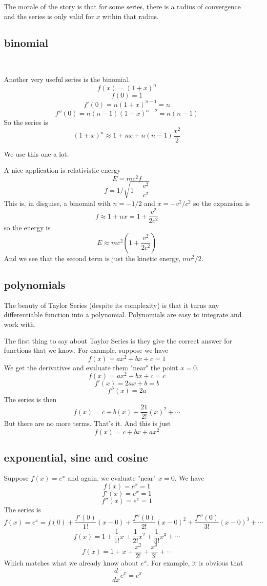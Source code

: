\documentclass[11pt, oneside]{article}
\begin{document}
The morale of the story is that for some series, there is a radius of convergence and the series is only valid for $x$ within that radius.

\subsection*{binomial}\

Another very useful series is the binomial.
\[ f(x) = (1 + x)^n \]
\[ f(0) = 1 \]
\[ f'(0) = n(1 + x)^{n-1} = n \]
\[ f''(0) = n(n-1)(1 + x)^{n-2} = n(n-1) \]
So the series is
\[ (1 + x)^n \approx 1 + nx + n(n-1) \frac{x^2}{2} \]

We use this one a lot.

A nice application is relativistic energy
\[ E = mc^2 f \]
\[ f =  1/\sqrt{1-\frac{v^2}{c^2}} \]
This is, in disguise, a binomial with $n=-1/2$ and $x=-v^2/c^2$ so the expansion is
\[ f  \approx 1 + nx = 1 + \frac{v^2}{2c^2} \]
so the energy is 
\[ E \approx mc^2 (1 + \frac{v^2}{2c^2} ) \]
And we see that the second term is just the kinetic energy, $mv^2/2$.

\subsection*{polynomials}

The beauty of Taylor Series (despite its complexity) is that it turns any differentiable function into a polynomial.  Polynomials are easy to integrate and work with.

The first thing to say about Taylor Series is they give the correct answer for functions that we know.  For example, suppose we have 
\[ f(x) = ax^2 + bx + c = 1 \]
We get the derivatives and evaluate them "near" the point $x=0$.
\[ f(x) = ax^2 + bx + c = c \]
\[ f'(x) = 2ax + b = b \]
\[ f''(x) = 2a \]
The series is then
\[ f(x) = c + b(x) + \frac{21}{2!}(x)^2 + \cdots \]
But there are no more terms.  That's it.  And this is just
\[ f(x) = c + bx + ax^2 \]

\subsection*{exponential, sine and cosine}

Suppose $f(x) = e^x$ and again, we evaluate "near" $x=0$.  We have
\[ f(x) = e^x = 1 \]
\[ f'(x) = e^x = 1 \]
\[ f''(x) = e^x = 1 \]
The series is
\[ f(x) = e^x = f(0) + \frac{f'(0)}{1!}(x-0) + \frac{f''(0)}{2!}(x-0)^2 + \frac{f'''(0)}{3!}(x-0)^3 + \cdots \]
\[ f(x) = 1 + \frac{1}{1!}x + \frac{1}{2!}x^2 + \frac{1}{3!}x^3 + \cdots \]
\[ f(x) = 1 + x + \frac{x^2}{2!} + \frac{x^3}{3!} + \cdots \]
Which matches what we already know about $e^x$.  For example, it is obvious that 
\[ \frac{d}{dx}e^x = e^x \]
\end{document}
